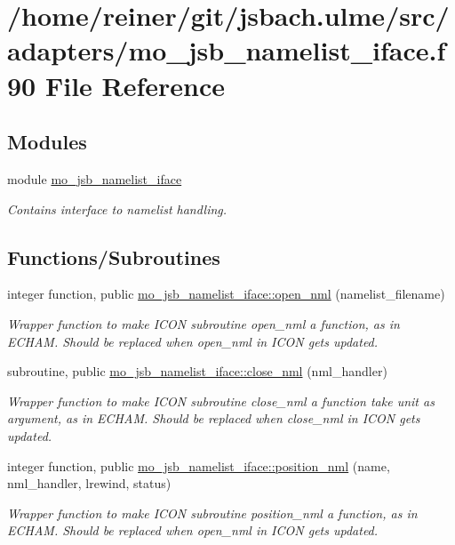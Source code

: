 \hypertarget{mo__jsb__namelist__iface_8f90}{}\section{/home/reiner/git/jsbach.ulme/src/adapters/mo\+\_\+jsb\+\_\+namelist\+\_\+iface.f90 File Reference}
\label{mo__jsb__namelist__iface_8f90}
\subsection*{Modules}
\begin{DoxyCompactItemize}
\item 
module \hyperlink{namespacemo__jsb__namelist__iface}{mo\+\_\+jsb\+\_\+namelist\+\_\+iface}
\begin{DoxyCompactList}\small\item\em Contains interface to namelist handling. \end{DoxyCompactList}\end{DoxyCompactItemize}
\subsection*{Functions/\+Subroutines}
\begin{DoxyCompactItemize}
\item 
integer function, public \hyperlink{namespacemo__jsb__namelist__iface_abb2821ffd4c30375faa307d522af3bcb}{mo\+\_\+jsb\+\_\+namelist\+\_\+iface\+::open\+\_\+nml} (namelist\+\_\+filename)
\begin{DoxyCompactList}\small\item\em Wrapper function to make I\+C\+O\+N subroutine open\+\_\+nml a function, as in E\+C\+H\+A\+M. Should be replaced when open\+\_\+nml in I\+C\+O\+N gets updated. \end{DoxyCompactList}\item 
subroutine, public \hyperlink{namespacemo__jsb__namelist__iface_a240047c255ab5bb3871ecdcdcd6d6a92}{mo\+\_\+jsb\+\_\+namelist\+\_\+iface\+::close\+\_\+nml} (nml\+\_\+handler)
\begin{DoxyCompactList}\small\item\em Wrapper function to make I\+C\+O\+N subroutine close\+\_\+nml a function take unit as argument, as in E\+C\+H\+A\+M. Should be replaced when close\+\_\+nml in I\+C\+O\+N gets updated. \end{DoxyCompactList}\item 
integer function, public \hyperlink{namespacemo__jsb__namelist__iface_a4d29dc192b429a0c5f11ecd7d7f637e9}{mo\+\_\+jsb\+\_\+namelist\+\_\+iface\+::position\+\_\+nml} (name, nml\+\_\+handler, lrewind, status)
\begin{DoxyCompactList}\small\item\em Wrapper function to make I\+C\+O\+N subroutine position\+\_\+nml a function, as in E\+C\+H\+A\+M. Should be replaced when open\+\_\+nml in I\+C\+O\+N gets updated. \end{DoxyCompactList}\end{DoxyCompactItemize}

